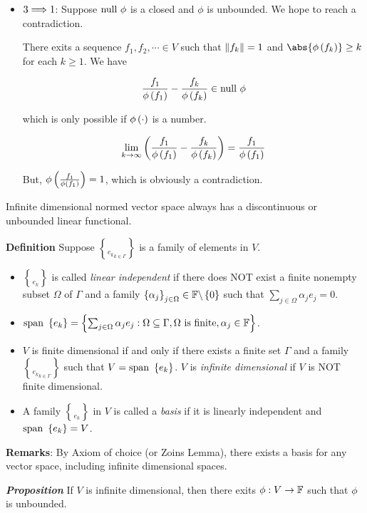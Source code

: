 \documentclass[
]{article}
\begin{document}
\begin{itemize}
\item
  \(3\Longrightarrow 1\): Suppose \(\text{null } \phi\) is a closed and \(\phi\) is
  unbounded. We hope to reach a contradiction.

  There exits a sequence \(f_1,f_2,\cdots \in V\) such that
  \(\|{f_k}\| = 1\) and \(\abs{\phi\pr{f_k}}\ge k\) for each
  \(k\ge 1\). We have

  \[\frac{f_1}{\phi\left(f_1\right)}-\frac{f_k}{\phi\left(f_k\right)}\in \text{null } \phi\]

  which is only possible if \(\phi\left(\cdot\right)\) is a number.

  \[\lim_{k\to\infty}\left(\frac{f_1}{\phi\left(f_1\right)}-\frac{f_k}{\phi\left(f_k\right)}\right) = \frac{f_1}{\phi\left(f_1\right)}\]

  But, \(\phi\left(\frac{f_1}{\phi\left(f_1\right)}\right) = 1\), which is obviously a
  contradiction.
\end{itemize}

Infinite dimensional normed vector space always has a discontinuous or
unbounded linear functional.

\textbf{Definition} Suppose \(\brace{e_k}_{k\in \Gamma}\) is a family of
elements in \(V\).

\begin{itemize}
\item
  \(\brace{e_k}\) is called \emph{linear independent} if there does NOT
  exist a finite nonempty subset \(\Omega\) of \(\Gamma\) and a family
  \(\left\{\alpha_j\right\}_{j\in \Omega}\in \mathbb F\backslash \left\{0\right\}\) such that
  \(\sum_{j\in \Omega}\alpha_je_j = 0\).
\item
  \(\text{span } \left\{e_k\right\} = \left\{\sum_{j\in \Omega}\alpha_je_j:\Omega\subseteq \Gamma, \Omega \text{ is finite}, \alpha_j\in \mathbb F\right\}\).
\item
  \(V\) is finite dimensional if and only if there exists a finite set
  \(\Gamma\) and a family \(\brace{e_k}_{k\in \Gamma}\) such that
  \(V = \text{span } \left\{e_k\right\}\). \(V\) is \emph{infinite dimensional} if
  \(V\) is NOT finite dimensional.
\item
  A family \(\brace{e_k}\) in \(V\) is called a \emph{basis} if it is
  linearly independent and \(\text{span } \left\{e_k\right\} = V\).
\end{itemize}

\textbf{Remarks}: By Axiom of choice (or Zoin\textquotesingle s Lemma),
there exists a basis for any vector space, including infinite
dimensional spaces.

\emph{\textbf{Proposition}} If \(V\) is infinite dimensional, then there
exits \(\phi:V\to \mathbb F\) such that \(\phi\) is unbounded.
\end{document}
